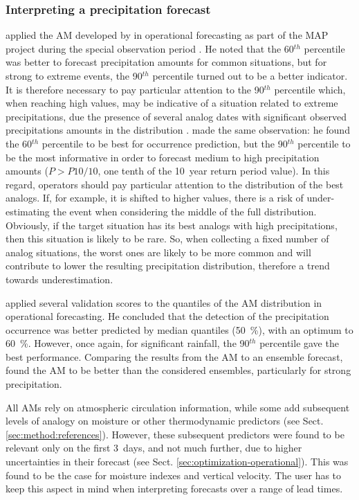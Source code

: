 \documentclass[review]{elsarticle}
\begin{document}
\subsubsection{Interpreting a precipitation forecast}
\label{sec:interpreting}

\citet{Djerboua2001} applied the AM developed by \citet{Guilbaud1997} in operational forecasting as part of the MAP project \citep[\textit{Mesoscale Alpine Programme}, see][]{Binder1996} during the special observation period \citep{Bougeault2001}. He noted that the 60$^{th}$ percentile was better to forecast precipitation amounts for common situations, but for strong to extreme events, the 90$^{th}$ percentile turned out to be a better indicator. It is therefore necessary to pay particular attention to the 90$^{th}$ percentile which, when reaching high values, may be indicative of a situation related to extreme precipitations, due the presence of several analog dates with significant observed precipitations amounts in the distribution \citep{Djerboua2001}. \citet{Bontron2004} made the same observation: he found the 60$^{th}$ percentile to be best for occurrence prediction, but the 90$^{th}$ percentile to be the most informative in order to forecast medium to high precipitation amounts ($P > P10/10$, one tenth of the 10~year return period value). In this regard, operators should pay particular attention to the distribution of the best analogs. If, for example, it is shifted to higher values, there is a risk of under-estimating the event when considering the middle of the full distribution. Obviously, if the target situation has its best analogs with high precipitations, then this situation is likely to be rare. So, when collecting a fixed number of analog situations, the worst ones are likely to be more common and will contribute to lower the resulting precipitation distribution, therefore a trend towards underestimation.


\citet{Marty2010} applied several validation scores to the quantiles of the AM distribution in operational forecasting. He concluded that the detection of the precipitation occurrence was better predicted by median quantiles (50~\%), with an optimum to 60~\%. However, once again, for significant rainfall, the 90$^{th}$ percentile gave the best performance. Comparing the results from the AM to an ensemble forecast, \citet{Marty2010} found the AM to be better than the considered ensembles, particularly for strong precipitation.

All AMs rely on atmospheric circulation information, while some add subsequent levels of analogy on moisture or other thermodynamic predictors (see Sect. \ref{sec:method:references}). However, these subsequent predictors were found to be relevant only on the first 3~days, and not much further, due to higher uncertainties in their forecast (see Sect. \ref{sec:optimization-operational}). This was found to be the case for moisture indexes and vertical velocity. The user has to keep this aspect in mind when interpreting forecasts over a range of lead times.
\end{document}
